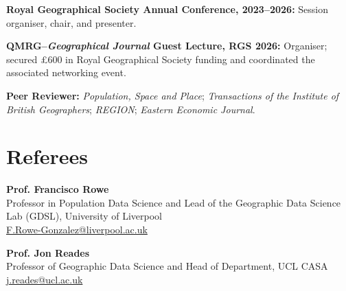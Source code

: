 \documentclass[a4paper,10.5pt]{article}
\begin{document}
\vspace{2pt}

{\small
\textbf{Royal Geographical Society Annual Conference, 2023--2026:}
Session organiser, chair, and presenter.
}

\vspace{2pt}

{\small
\textbf{QMRG--\textit{Geographical Journal} Guest Lecture, RGS 2026:}
Organiser; secured \pounds600 in Royal Geographical Society funding and
coordinated the associated networking event.
}

\vspace{2pt}

{\small
\textbf{Peer Reviewer:}
\textit{Population, Space and Place};
\textit{Transactions of the Institute of British Geographers};
\textit{REGION};
\textit{Eastern Economic Journal}.
}

\section{Referees}

{\small
\textbf{Prof. Francisco Rowe}\\[-1pt]
Professor in Population Data Science and Lead of the Geographic Data Science
Lab (GDSL), University of Liverpool\\
\href{mailto:F.Rowe-Gonzalez@liverpool.ac.uk}
{F.Rowe-Gonzalez@liverpool.ac.uk}

\vspace{5pt}

\textbf{Prof. Jon Reades}\\[-1pt]
Professor of Geographic Data Science and Head of Department, UCL CASA\\
\href{mailto:j.reades@ucl.ac.uk}
{j.reades@ucl.ac.uk}
}
\end{document}
